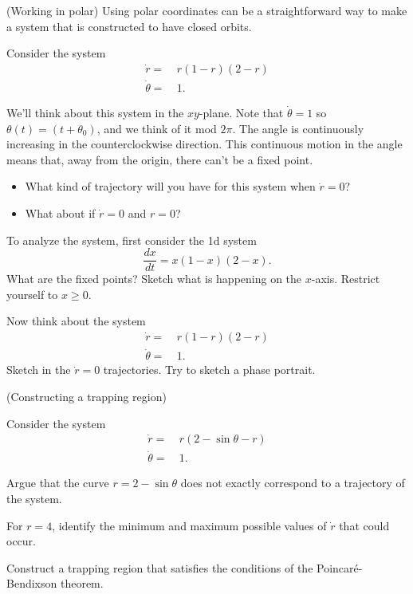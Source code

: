\documentclass[12pt,letterpaper,noanswers]{exam}
\begin{document}
\begin{questions}
\question (Working in polar) Using polar coordinates can be a straightforward way to make a system that is constructed to have closed orbits.

Consider the system
\begin{align*}
\dot{r} = &\  r(1-r)(2-r) \\
\dot{\theta} = &\ 1.
\end{align*}

\begin{parts}
\item We'll think about this system in the $xy$-plane.  Note that $\dot{\theta} = 1$ so $\theta(t) = (t+\theta_0)$, and we think of it mod $2\pi$.  The angle is continuously increasing in the counterclockwise direction.  This continuous motion in the angle means that, away from the origin, there can't be a fixed point.  
\begin{itemize}
\item What kind of trajectory will you have for this system when $\dot{r} = 0$?
\item What about if $\dot{r}= 0$ and $r = 0$?
\end{itemize}
\item To analyze the system, first consider the 1d system
\[\frac{dx}{dt} = x(1-x)(2-x).\] 
What are the fixed points?  Sketch what is happening on the $x$-axis.  Restrict yourself to $x\geq 0$.
\item Now think about the system 
\begin{align*}
\dot{r} = &\  r(1-r)(2-r) \\
\dot{\theta} = &\ 1.
\end{align*}
Sketch in the $\dot{r} = 0$ trajectories.  Try to sketch a phase portrait.
\end{parts}


\question (Constructing a trapping region) 

Consider the system 
\begin{align*}
\dot{r} = &\  r(2-\sin\theta -r) \\
\dot{\theta} = &\ 1.
\end{align*}

\begin{parts}
\item Argue that the curve $r = 2-\sin\theta$ does not exactly correspond to a trajectory of the system.
\item For $r = 4$, identify the minimum and maximum possible values of $\dot r$ that could occur.
\item Construct a trapping region that satisfies the conditions of the Poincar\'e-Bendixson theorem.
\end{parts}


\end{questions}
\end{document}
